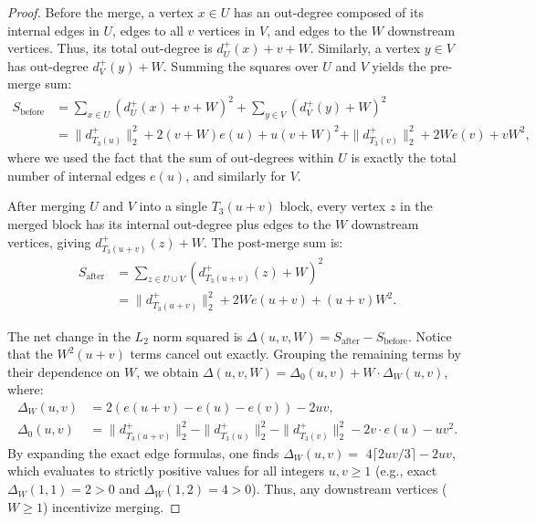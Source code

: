 \documentclass[a4paper]{amsart}
\begin{document}
\begin{proof}
    Before the merge, a vertex $x \in U$ has an out-degree composed of its internal edges in $U$, edges to all $v$ vertices in $V$, and edges to the $W$ downstream vertices. Thus, its total out-degree is $d^+_U(x) + v + W$. Similarly, a vertex $y \in V$ has out-degree $d^+_V(y) + W$. Summing the squares over $U$ and $V$ yields the pre-merge sum:
    \begin{align*}
        S_{\text{before}} &= \sum_{x \in U} (d^+_U(x) + v + W)^2 + \sum_{y \in V} (d^+_V(y) + W)^2 \\
        &= \|d^+_{T_3(u)}\|_2^2 + 2(v+W)e(u) + u(v+W)^2 + \|d^+_{T_3(v)}\|_2^2 + 2We(v) + vW^2,
    \end{align*}
    where we used the fact that the sum of out-degrees within $U$ is exactly the total number of internal edges $e(u)$, and similarly for $V$.

    After merging $U$ and $V$ into a single $T_3(u+v)$ block, every vertex $z$ in the merged block has its internal out-degree plus edges to the $W$ downstream vertices, giving $d^+_{T_3(u+v)}(z) + W$. The post-merge sum is:
    \begin{align*}
        S_{\text{after}} &= \sum_{z \in U \cup V} (d^+_{T_3(u+v)}(z) + W)^2 \\
        &= \|d^+_{T_3(u+v)}\|_2^2 + 2We(u+v) + (u+v)W^2.
    \end{align*}

    The net change in the $L_2$ norm squared is $\Delta(u, v, W) = S_{\text{after}} - S_{\text{before}}$. Notice that the $W^2(u+v)$ terms cancel out exactly. Grouping the remaining terms by their dependence on $W$, we obtain $\Delta(u, v, W) = \Delta_0(u, v) + W \cdot \Delta_W(u, v)$, where:
    \begin{align*}
        \Delta_W(u, v) &= 2(e(u+v) - e(u) - e(v)) - 2uv, \\
        \Delta_0(u, v) &= \|d^+_{T_3(u+v)}\|_2^2 - \|d^+_{T_3(u)}\|_2^2 - \|d^+_{T_3(v)}\|_2^2 - 2v \cdot e(u) - u v^2.
    \end{align*}
    By expanding the exact edge formulas, one finds $\Delta_W(u, v) =$ $4\lceil 2uv/3 \rceil - 2uv$, which evaluates to strictly positive values for all integers $u,v \ge 1$ (e.g., exact $\Delta_W(1,1) = 2 > 0$ and $\Delta_W(1,2) = 4 > 0$). Thus, any downstream vertices ($W \ge 1$) incentivize merging.


\end{proof}
\end{document}
